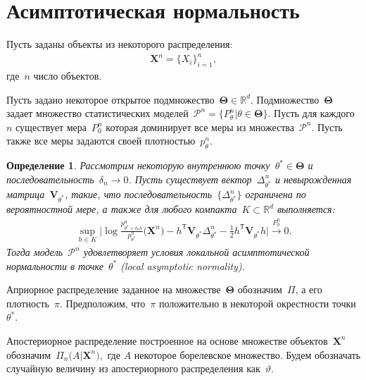 \documentclass[12pt, twoside]{article}
\newtheorem{definition}{Определение}[section]
\numberwithin{equation}{section}
\begin{document}
\section{Асимптотическая нормальность}
Пусть заданы объекты из некоторого распределения:
\[
\begin{aligned}
\textbf{X}^{n} = \{X_i\}_{i=1}^{n},
\end{aligned}
\]
где~$n$ число объектов.

Пусть задано некоторое открытое подмножество~$\bm{\Theta}\in\mathbb{R}^d$. Подмножество~$\bm{\Theta}$ задает множество статистических моделей~$\mathcal{P}^{n} = \{P_{\theta}^{n}| \theta \in \bm{\Theta}\}.$ Пусть для каждого~$n$ существует мера~$P_{0}^{n}$ которая доминирует все меры из множества~$\mathcal{P}^{n}$. Пусть также все меры задаются своей плотностью~$p_{\theta}^{n}$.

\begin{definition}
\label{def:lan}
Рассмотрим некоторую внутреннюю точку~$\theta^{*}\in \bm{\Theta}$ и последовательность~$\delta_{n} \to 0$. Пусть существует вектор~$\Delta^{n}_{\theta^{*}}$ и невырожденная матрица~$\textbf{V}_{\theta^{*}}$, такие, что последовательность~$\{\Delta^{n}_{\theta^{*}}\}$ ограничена по вероятностной мере, а также для любого компакта~$K \subset \mathbb{R}^{d}$ выполняется:
\[
\begin{aligned}
\sup_{h\in K}\bigr|\log\frac{p^{n}_{\theta^{*}+\delta_{n}h}}{p^{n}_{\theta^{*}}}\bigr(\textbf{X}^{n}\bigr) -h^{\mathsf{T}}\textbf{V}_{\theta^{*}}\Delta^{n}_{\theta^*} - \frac{1}{2}h^{\mathsf{T}}\textbf{V}_{\theta^*}h\bigr| \overset{P_0^{n}}{\to} 0.
\end{aligned}
\]
Тогда модель~$\mathcal{P}^{n}$ удовлетворяет условия локальной асимптотической нормальности в точке~$\theta^*$ (local asymptotic normality).
\end{definition}

Априорное распределение заданное на множестве~$\bm{\Theta}$ обозначим~$\Pi$, а его плотность~$\pi$. Предположим, что~$\pi$ положительно в некоторой окрестности точки~$\theta^*$.

Апостериорное распределение построенное на основе множестве объектов~$\textbf{X}^{n}$ обозначим~$\Pi_{n}\bigr(A|\textbf{X}^{n}\bigr),$ где $A$ некоторое борелевское множество. Будем обозначать случайную величину из апостериорного распределения как~$\vartheta$.
\end{document}
